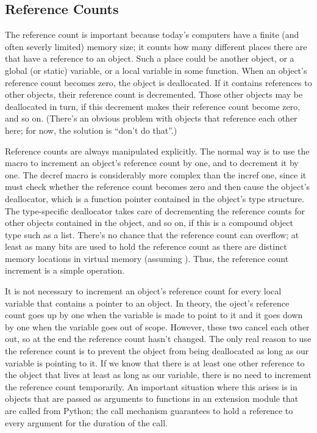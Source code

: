 \documentclass[twoside,openright]{report}
\begin{document}
\subsection{Reference Counts}

The reference count is important because today's computers have a 
finite (and often severly limited) memory size; it counts how many 
different places there are that have a reference to an object.  Such a 
place could be another object, or a global (or static) \C{} variable, or 
a local variable in some \C{} function.  When an object's reference count 
becomes zero, the object is deallocated.  If it contains references to 
other objects, their reference count is decremented.  Those other 
objects may be deallocated in turn, if this decrement makes their 
reference count become zero, and so on.  (There's an obvious problem 
with objects that reference each other here; for now, the solution is 
``don't do that''.)

Reference counts are always manipulated explicitly.  The normal way is 
to use the macro  to increment an object's 
reference count by one, and  to decrement it by 
one.  The decref macro is considerably more complex than the incref one, 
since it must check whether the reference count becomes zero and then 
cause the object's deallocator, which is a function pointer contained 
in the object's type structure.  The type-specific deallocator takes 
care of decrementing the reference counts for other objects contained 
in the object, and so on, if this is a compound object type such as a 
list.  There's no chance that the reference count can overflow; at 
least as many bits are used to hold the reference count as there are 
distinct memory locations in virtual memory (assuming 
).  Thus, the reference count 
increment is a simple operation.

It is not necessary to increment an object's reference count for every 
local variable that contains a pointer to an object.  In theory, the 
oject's reference count goes up by one when the variable is made to 
point to it and it goes down by one when the variable goes out of 
scope.  However, these two cancel each other out, so at the end the 
reference count hasn't changed.  The only real reason to use the 
reference count is to prevent the object from being deallocated as 
long as our variable is pointing to it.  If we know that there is at 
least one other reference to the object that lives at least as long as 
our variable, there is no need to increment the reference count 
temporarily.  An important situation where this arises is in objects 
that are passed as arguments to \C{} functions in an extension module 
that are called from Python; the call mechanism guarantees to hold a 
reference to every argument for the duration of the call.
\end{document}
